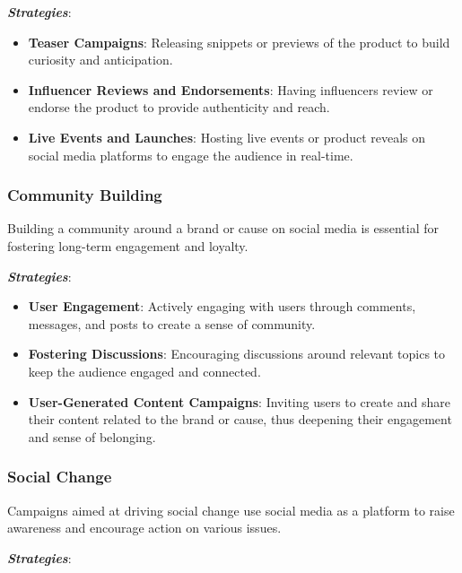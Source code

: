 \documentclass[
]{book}
\providecommand{\tightlist}{%
  \setlength{\itemsep}{0pt}\setlength{\parskip}{0pt}}
\begin{document}
\textbf{\emph{Strategies}}:

\begin{itemize}
\tightlist
\item
  \textbf{Teaser Campaigns}: Releasing snippets or previews of the product to build curiosity and anticipation.
\item
  \textbf{Influencer Reviews and Endorsements}: Having influencers review or endorse the product to provide authenticity and reach.
\item
  \textbf{Live Events and Launches}: Hosting live events or product reveals on social media platforms to engage the audience in real-time.
\end{itemize}

\hypertarget{community-building}{%
\subsubsection*{Community Building}\label{community-building}}

Building a community around a brand or cause on social media is essential for fostering long-term engagement and loyalty.

\textbf{\emph{Strategies}}:

\begin{itemize}
\tightlist
\item
  \textbf{User Engagement}: Actively engaging with users through comments, messages, and posts to create a sense of community.
\item
  \textbf{Fostering Discussions}: Encouraging discussions around relevant topics to keep the audience engaged and connected.
\item
  \textbf{User-Generated Content Campaigns}: Inviting users to create and share their content related to the brand or cause, thus deepening their engagement and sense of belonging.
\end{itemize}

\hypertarget{social-change}{%
\subsubsection*{Social Change}\label{social-change}}

Campaigns aimed at driving social change use social media as a platform to raise awareness and encourage action on various issues.

\textbf{\emph{Strategies}}:
\end{document}
